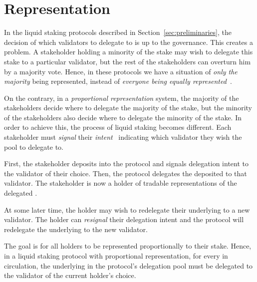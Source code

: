 \section{Representation}

In the liquid staking protocols described in Section~\ref{sec:preliminaries},
the decision of which validators to delegate to is up to the governance.
This creates a problem. A stakeholder holding a minority of the stake
may wish to delegate this stake to a particular validator, but the rest
of the stakeholders can overturn him by a majority vote. Hence, in these
protocols we have a situation of \emph{only the majority} being represented,
instead of \emph{everyone being equally represented}~\cite{mill1862true}.

On the contrary, in a \emph{proportional representation} system, the
majority of the stakeholders decide where to delegate the majority of
the stake, but the minority of the stakeholders also decide where to delegate
the minority of the stake. In order to achieve this, the process of liquid
staking becomes different. Each stakeholder must \emph{signal} their
\emph{intent}~\cite{quicksilver} indicating which validator they wish
the pool to delegate to.

First, the stakeholder deposits \asset into the protocol and signals
delegation intent to the validator of their choice. Then, the protocol
delegates the deposited \asset to that validator. The stakeholder is
now a holder of tradable \stasset representations of the delegated \asset.

At some later time, the \stasset holder may wish to redelegate
their underlying \asset to a new validator.
The \stasset holder can \emph{resignal} their delegation intent and the protocol
will redelegate the underlying \asset to the new validator.

The goal is for all \stasset holders to be represented proportionally to
their stake. Hence, in a liquid staking protocol with proportional
representation, for every \stasset in circulation, the underlying \asset
in the protocol's delegation pool must be delegated to the validator
of the current \stasset holder's choice.

